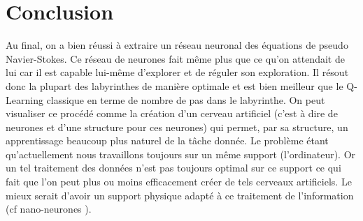 \documentclass[10pt]{article}
\begin{document}

\section{Conclusion}
Au final, on a bien réussi à extraire un réseau neuronal des équations de pseudo Navier-Stokes. Ce réseau de neurones fait même plus que ce qu'on attendait de lui car il est capable lui-même d'explorer et de réguler son exploration. Il résout donc la plupart des labyrinthes de manière optimale et est bien meilleur que le Q-Learning classique en terme de nombre de pas dans le labyrinthe. On peut visualiser ce procédé comme la création d'un cerveau artificiel (c'est à dire de neurones et d'une structure pour ces neurones) qui permet, par sa structure, un apprentissage beaucoup plus naturel de la tâche donnée. Le problème étant qu'actuellement nous travaillons toujours sur un même support (l'ordinateur). Or un tel traitement des données n'est pas toujours optimal sur ce support ce qui fait que l'on peut plus ou moins efficacement créer de tels cerveaux artificiels. Le mieux serait d'avoir un support physique adapté à ce traitement de l'information (cf nano-neurones \cite{nano_neurons}).
\end{document}
